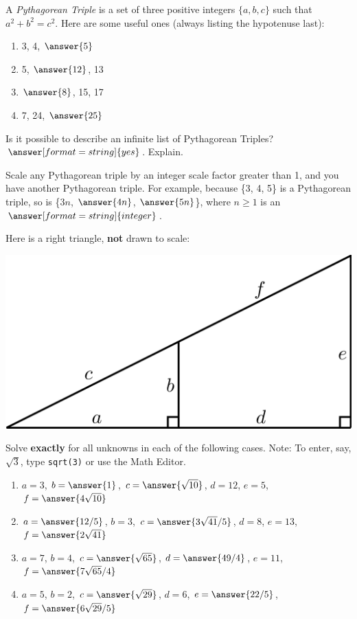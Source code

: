 \documentclass[nooutcomes]{ximera}
\begin{document}
\begin{question}
A \textit{Pythagorean Triple} is a set
  of three positive integers $\{a,b,c\}$ such that $a^2 + b^2 =
  c^2$. Here are some useful ones (always listing the hypotenuse last): 
\begin{enumerate}
\item 3, 4, $\answer{5}$
\item 5, $\answer{12}$, 13
\item $\answer{8}$, 15, 17
\item 7, 24, $\answer{25}$
\end{enumerate}
  Is it possible to describe an infinite list of Pythagorean Triples?  
  $\answer[format=string]{yes}$. 
  Explain. 
\begin{question}
Scale any Pythagorean triple by an integer scale factor greater than 1, and you have another Pythagorean triple.  For example, because \{3, 4, 5\} is a Pythagorean triple, so is \{$3n$, $\answer{4n}$, $\answer{5n}$\}, where $n \ge 1$ is an $\answer[format=string]{integer}$.  
\end{question}
\end{question}

\begin{question}
Here is a right triangle, \textbf{not} drawn to scale:
\begin{image}
\includegraphics[scale=1.1]{origamiSimQ.png}
\end{image}
Solve \textbf{exactly} for all unknowns in each of the following cases.  Note:  To enter, 
say, $\sqrt{3}$, type \texttt{sqrt(3)} or use the Math Editor. 
\begin{enumerate}
\item $a = 3$, $b = \answer{1}$, $c = \answer{\sqrt{10}}$, $d = 12$, $e = 5$, $f = \answer{4 \sqrt{10}}$
\item $a = \answer{12/5}$, $b = 3$, $c = \answer{3\sqrt{41}/5}$, $d =8$, $e = 13$, $f = \answer{2\sqrt{41}}$
\item $a = 7$, $b = 4$, $c = \answer{\sqrt{65}}$, $d =\answer{49/4}$, $e = 11$, $f = \answer{7\sqrt{65}/4}$
\item $a = 5$, $b = 2$, $c = \answer{\sqrt{29}}$, $d =6$, $e = \answer{22/5}$, $f = \answer{6\sqrt{29}/5}$
\end{enumerate}
\end{question}
\end{document}

